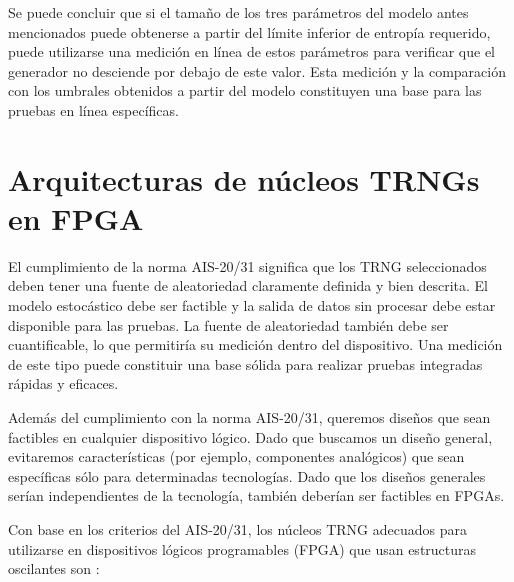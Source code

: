             Se puede concluir que si el tamaño de los tres parámetros del modelo antes mencionados puede obtenerse a partir del límite inferior de entropía requerido, puede utilizarse una medición en línea de estos parámetros para verificar que el generador no desciende por debajo de este valor. Esta medición y la comparación con los umbrales obtenidos a partir del modelo constituyen una base para las pruebas en línea específicas.

    \section{Arquitecturas de núcleos TRNGs en FPGA}

        El cumplimiento de la norma AIS-20/31 significa que los TRNG seleccionados deben tener una fuente de aleatoriedad claramente definida y bien descrita. El modelo estocástico debe ser factible y la salida de datos sin procesar debe estar disponible para las pruebas. La fuente de aleatoriedad también debe ser cuantificable, lo que permitiría su medición dentro del dispositivo. Una medición de este tipo puede constituir una base sólida para realizar pruebas integradas rápidas y eficaces.

        Además del cumplimiento con la norma AIS-20/31, queremos diseños que sean factibles en cualquier dispositivo lógico. Dado que buscamos un diseño general, evitaremos características (por ejemplo, componentes analógicos) que sean específicas sólo para determinadas tecnologías. Dado que los diseños generales serían independientes de la tecnología, también deberían ser factibles en FPGAs.

        Con base en los criterios del AIS-20/31, los núcleos TRNG adecuados para utilizarse en dispositivos lógicos programables (FPGA) que usan estructuras oscilantes son \cite{Petura2016}:
	
